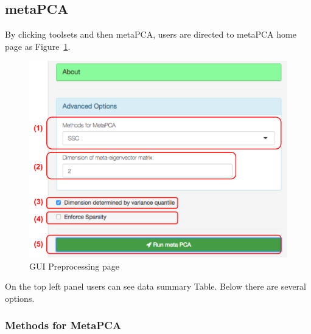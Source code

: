 \subsection{metaPCA}
By clicking toolsets and then metaPCA,
users are directed to metaPCA home page as Figure~\ref{fig:metaPCAHome}.

\begin{figure}[H]
\begin{center}
\includegraphics[scale=0.35]{./figure/metaPCA/metaPCAHome}
\caption{GUI Preprocessing page}
\label{fig:metaPCAHome}
\end{center}
\end{figure}

On the top left panel users can see data summary Table.
Below there are several options.
\subsubsection{Methods for MetaPCA}

